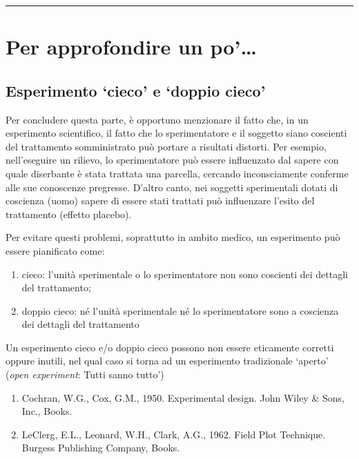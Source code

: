 \documentclass[a4paper,12pt,oneside]{book}
\providecommand{\tightlist}{%
  \setlength{\itemsep}{0pt}\setlength{\parskip}{0pt}}
\begin{document}
\begin{center}\rule{0.5\linewidth}{\linethickness}\end{center}

\hypertarget{per-approfondire-un-po-1}{%
\section{Per approfondire un po'\ldots{}}\label{per-approfondire-un-po-1}}

\hypertarget{esperimento-cieco-e-doppio-cieco}{%
\subsection{Esperimento `cieco' e `doppio cieco'}\label{esperimento-cieco-e-doppio-cieco}}

Per concludere questa parte, è opportuno menzionare il fatto che, in un esperimento scientifico, il fatto che lo sperimentatore e il soggetto siano coscienti del trattamento somministrato può portare a risultati distorti. Per esempio, nell'eseguire un rilievo, lo sperimentatore può essere influenzato dal sapere con quale diserbante è stata trattata una parcella, cercando inconsciamente conferme alle sue conoscenze pregresse. D'altro canto, nei soggetti sperimentali dotati di coscienza (uomo) sapere di essere stati trattati può influenzare l'esito del trattamento (effetto placebo).

Per evitare questi problemi, soprattutto in ambito medico, un esperimento può essere pianificato come:

\begin{enumerate}
\def\labelenumi{\arabic{enumi}.}
\tightlist
\item
  cieco: l'unità sperimentale o lo sperimentatore non sono coscienti dei dettagli del trattamento;
\item
  doppio cieco: né l'unità sperimentale né lo sperimentatore sono a coscienza dei dettagli del trattamento
\end{enumerate}

Un esperimento cieco e/o doppio cieco possono non essere eticamente corretti oppure inutili, nel qual caso si torna ad un esperimento tradizionale `aperto' (\emph{open experiment}: Tutti sanno tutto')

\begin{enumerate}
\def\labelenumi{\arabic{enumi}.}
\tightlist
\item
  Cochran, W.G., Cox, G.M., 1950. Experimental design. John Wiley \& Sons, Inc., Books.
\item
  LeClerg, E.L., Leonard, W.H., Clark, A.G., 1962. Field Plot Technique. Burgess Publishing Company, Books.
\end{enumerate}
\end{document}
